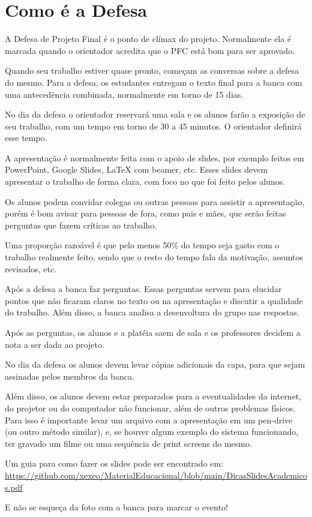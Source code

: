 
\chapter{Como é a Defesa}

A Defesa de Projeto Final é o ponto de clímax do projeto. Normalmente ela é marcada quando o orientador acredita que o PFC está bom para ser aprovado.

Quando seu trabalho estiver quase pronto, começam as conversas sobre a defesa do mesmo. Para a defesa, os estudantes entregam o texto final para a banca com uma antecedência combinada, normalmente em torno de 15 dias.

No dia da defesa o orientador reservará uma sala e os alunos farão a exposição de seu trabalho, com um tempo em torno de 30 a 45 minutos. O orientador definirá esse tempo.

A apresentação é normalmente feita com o apoio de slides, por exemplo feitos em PowerPoint, Google Slides, LaTeX com beamer, etc. Esses slides devem apresentar o trabalho de forma clara, com foco no que foi feito pelos alunos.

Os alunos podem convidar colegas ou outras pessoas para assistir a apresentação, porém é bom avisar para pessoas de fora, como pais e mães, que serão feitas perguntas que fazem críticas ao trabalho.

Uma proporção razoável é que pelo menos 50\% do tempo seja gasto com o trabalho realmente feito, sendo que o resto do tempo fala da motivação, assuntos revisados, etc.

Após a defesa a banca faz perguntas. Essas perguntas servem para elucidar pontos que não ficaram claros no texto ou na apresentação e discutir a qualidade do trabalho. Além disso, a banca analisa a desenvoltura do grupo nas respostas.

Após as perguntas, os alunos e a platéia saem de sala e os professores decidem a nota a ser dada ao projeto.

No dia da defesa os alunos devem levar cópias adicionais da capa, para que sejam assinadas pelos membros da banca.

Além disso, os alunos devem estar preparados para a eventualidades da internet, do projetor ou do computador não funcionar, além de outros problemas físicos. Para isso é importante levar um arquivo com a apresentação em um pen-drive (ou outro método similar), e, se houver algum exemplo do sistema funcionando, ter gravado um filme ou uma sequência de print screens do mesmo.

Um guia para como fazer os slides pode ser encontrado em: \url{https://github.com/xexeo/MaterialEducacional/blob/main/DicasSlidesAcademicos.pdf}

E não se esqueça da foto com a banca para marcar o evento!